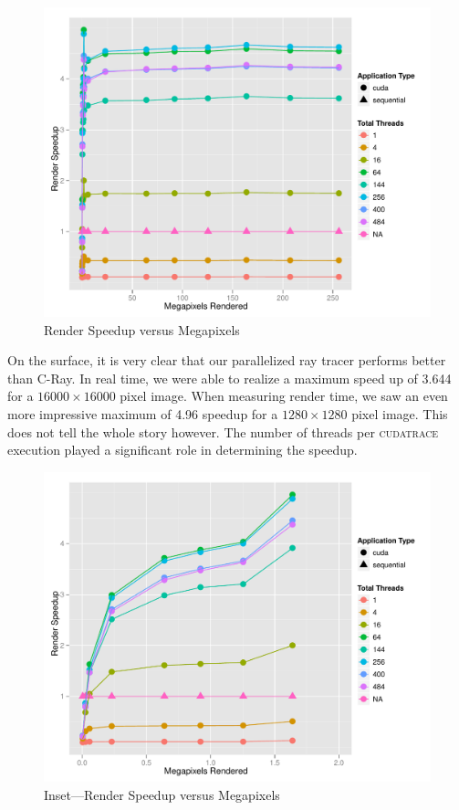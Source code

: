 \documentclass[12pt]{article}
\begin{document}
\begin{figure}
    \caption{Render Speedup versus Megapixels} \label{fig:render_speedup}
    \begin{center}
\includegraphics{cudatrace-007}
    \end{center}
\end{figure}

On the surface, it is very clear that our parallelized ray tracer performs better than C-Ray. In real time, we were able to realize a maximum speed up of 3.644 for a $16000\times 16000$ pixel image. When measuring render time, we saw an even more impressive maximum of 4.96 speedup for a $1280 \times 1280$ pixel image. This does not tell the whole story however. The number of threads per \textsc{cudatrace} execution played a significant role in determining the speedup.

\begin{figure}
    \caption{Inset---Render Speedup versus Megapixels} \label{fig:render_speedup_zoom}
    \begin{center}
\includegraphics{cudatrace-008}
    \end{center}
\end{figure}
\end{document}
